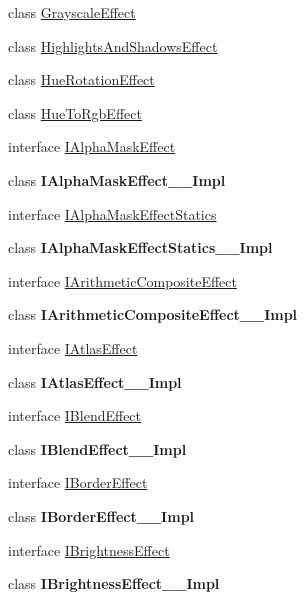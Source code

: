 \begin{DoxyCompactItemize}
\item 
class \hyperlink{class_microsoft_1_1_graphics_1_1_canvas_1_1_effects_1_1_grayscale_effect}{Grayscale\+Effect}
\item 
class \hyperlink{class_microsoft_1_1_graphics_1_1_canvas_1_1_effects_1_1_highlights_and_shadows_effect}{Highlights\+And\+Shadows\+Effect}
\item 
class \hyperlink{class_microsoft_1_1_graphics_1_1_canvas_1_1_effects_1_1_hue_rotation_effect}{Hue\+Rotation\+Effect}
\item 
class \hyperlink{class_microsoft_1_1_graphics_1_1_canvas_1_1_effects_1_1_hue_to_rgb_effect}{Hue\+To\+Rgb\+Effect}
\item 
interface \hyperlink{interface_microsoft_1_1_graphics_1_1_canvas_1_1_effects_1_1_i_alpha_mask_effect}{I\+Alpha\+Mask\+Effect}
\item 
class {\bfseries I\+Alpha\+Mask\+Effect\+\_\+\+\_\+\+Impl}
\item 
interface \hyperlink{interface_microsoft_1_1_graphics_1_1_canvas_1_1_effects_1_1_i_alpha_mask_effect_statics}{I\+Alpha\+Mask\+Effect\+Statics}
\item 
class {\bfseries I\+Alpha\+Mask\+Effect\+Statics\+\_\+\+\_\+\+Impl}
\item 
interface \hyperlink{interface_microsoft_1_1_graphics_1_1_canvas_1_1_effects_1_1_i_arithmetic_composite_effect}{I\+Arithmetic\+Composite\+Effect}
\item 
class {\bfseries I\+Arithmetic\+Composite\+Effect\+\_\+\+\_\+\+Impl}
\item 
interface \hyperlink{interface_microsoft_1_1_graphics_1_1_canvas_1_1_effects_1_1_i_atlas_effect}{I\+Atlas\+Effect}
\item 
class {\bfseries I\+Atlas\+Effect\+\_\+\+\_\+\+Impl}
\item 
interface \hyperlink{interface_microsoft_1_1_graphics_1_1_canvas_1_1_effects_1_1_i_blend_effect}{I\+Blend\+Effect}
\item 
class {\bfseries I\+Blend\+Effect\+\_\+\+\_\+\+Impl}
\item 
interface \hyperlink{interface_microsoft_1_1_graphics_1_1_canvas_1_1_effects_1_1_i_border_effect}{I\+Border\+Effect}
\item 
class {\bfseries I\+Border\+Effect\+\_\+\+\_\+\+Impl}
\item 
interface \hyperlink{interface_microsoft_1_1_graphics_1_1_canvas_1_1_effects_1_1_i_brightness_effect}{I\+Brightness\+Effect}
\item 
class {\bfseries I\+Brightness\+Effect\+\_\+\+\_\+\+Impl}

\end{DoxyCompactItemize}
